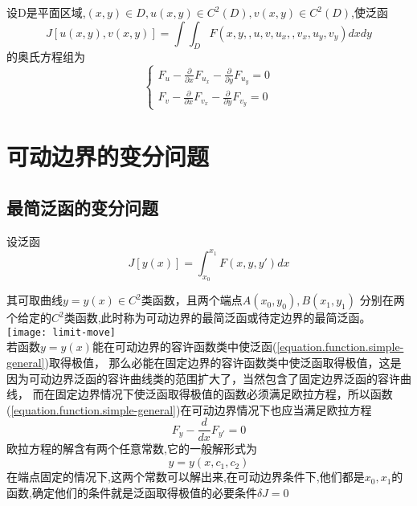 \documentclass{book}
\begin{document}
\begin{corollary}
设D是平面区域,$(x,y) \in D ,u(x,y) \in C^2(D),v(x,y) \in C^2(D)$,使泛函
$$ J[u(x,y),v(x,y)]=\int\int_{D}F(x,y,,u,v,u_x,,v_x,u_y,v_y)dxdy $$
的奥氏方程组为
$$
\left\{
  \begin{array}{ll}
   F_u -\frac{\partial}{\partial x}F_{u_x}-\frac{\partial}{\partial y}F_{u_y} = 0 \\
   F_v -\frac{\partial}{\partial x}F_{v_x}-\frac{\partial}{\partial y}F_{v_y} = 0
  \end{array}
\right.
$$
\end{corollary}

\section{可动边界的变分问题}
\subsection{最简泛函的变分问题}
设泛函
\begin{equation}
J[y(x)]=\int_{x_0}^{x_1}F(x,y,y')dx
\label{equation.function.simple-general}
\end{equation}

其可取曲线$y = y(x) \in C^2$类函数，且两个端点$A(x_0,y_0),B(x_1,y_1)$ 分别在两个给定的$C^2$类函数,此时称为可动边界的最简泛函或待定边界的最简泛函。\\

\texttt{[image: limit-move]}\\

若函数$y=y(x)$能在可动边界的容许函数类中使泛函(\ref{equation.function.simple-general})取得极值，
那么必能在固定边界的容许函数类中使泛函取得极值，这是因为可动边界泛函的容许曲线类的范围扩大了，当然包含了固定边界泛函的容许曲线，
而在固定边界情况下使泛函取得极值的函数必须满足欧拉方程，所以函数(\ref{equation.function.simple-general})在可动边界情况下也应当满足欧拉方程
$$ F_y - \frac{d}{dx}F_{y'} =0 $$
欧拉方程的解含有两个任意常数,它的一般解形式为
$$y=y(x,c_1,c_2)$$
在端点固定的情况下,这两个常数可以解出来,在可动边界条件下,他们都是$x_0,x_1$的函数,确定他们的条件就是泛函取得极值的必要条件$\delta J=0$
\end{document}

